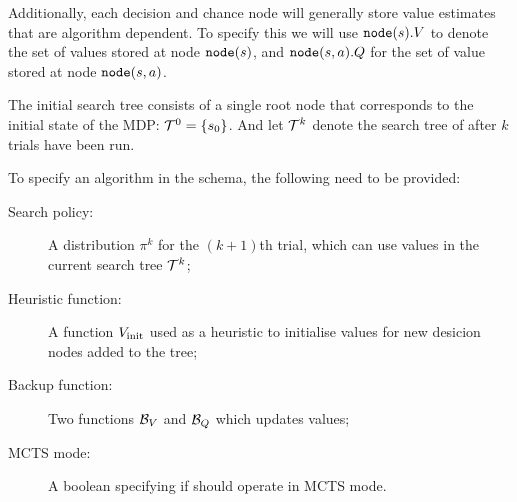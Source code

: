         Additionally, each decision and chance node will generally store value estimates that are algorithm dependent. To specify this we will use ${\textnormal{\texttt{node}}}(s).V$ to denote the set of values stored at node ${\textnormal{\texttt{node}}}(s)$, and ${\textnormal{\texttt{node}}}(s,a).Q$ for the set of value stored at node ${\textnormal{\texttt{node}}}(s,a)$. 


        The initial search tree consists of a single root node that corresponds to the initial state of the MDP: $\mathcal{T}^0=\{s_0\}$. And let $\mathcal{T}^k$ denote the search tree of \thtspp\ewe after $k$ trials have been run.

        To specify an algorithm in the \thtspp\ewe schema, the following need to be provided:
        \begin{description}
            \item[Search policy:]
                A distribution  $\pi^{k}$ for the $(k+1)$th trial, which can use values in the current search tree $\mathcal{T}^{k}$;
            \item[Heuristic function:]
                A function $V_{\textnormal{init}}$ used as a heuristic to initialise values for new desicion nodes added to the tree;
            \item[Backup function:]
                Two functions $\mathcal{B}_V$ and $\mathcal{B}_Q$ which updates values; 
            \item[MCTS mode:]
                A boolean \mctsmode specifying if \thtspp\ewe should operate in MCTS mode.
        \end{description}


